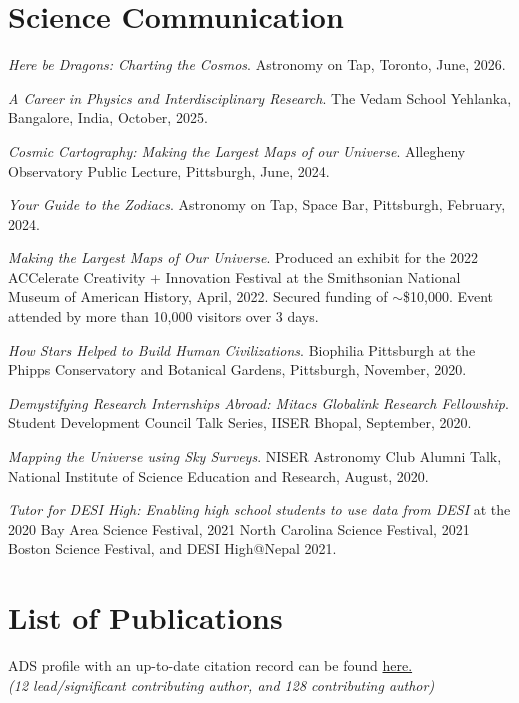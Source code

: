 \documentclass[10pt,a4paper,roman,]{moderncv} %
\begin{document}
\section{Science Communication}

 \begin{etaremune}[leftmargin=40pt,labelsep=10pt]
 \item \textit{Here be Dragons: Charting the Cosmos}. Astronomy on Tap, Toronto, June, 2026.
 \item \textit{A Career in Physics and Interdisciplinary Research}. The Vedam School Yehlanka, Bangalore, India, October, 2025.
 \item \textit{Cosmic Cartography: Making the Largest Maps of our Universe}. Allegheny Observatory Public Lecture, Pittsburgh, June, 2024.
 \item \textit{Your Guide to the Zodiacs}. Astronomy on Tap, Space Bar, Pittsburgh, February, 2024.
 \item \textit{Making the Largest Maps of Our Universe}. Produced an exhibit for the 2022 ACCelerate Creativity + Innovation Festival at the Smithsonian National Museum of American History, April, 2022. Secured funding of $\sim$\$10,000. Event attended by more than 10,000 visitors over 3 days. 
 \item \textit{How Stars Helped to Build Human Civilizations}. Biophilia Pittsburgh at the Phipps Conservatory and Botanical Gardens, Pittsburgh, November, 2020.
\item \textit{Demystifying Research Internships Abroad: Mitacs Globalink Research Fellowship}. Student Development
Council Talk Series, IISER Bhopal, September, 2020.
\item \textit{Mapping the Universe using Sky Surveys}. NISER Astronomy Club Alumni Talk, National Institute of Science Education and Research, August, 2020.
\item \textit{Tutor for DESI High: Enabling high school students to use data from DESI} at the 2020 Bay Area Science Festival, 2021 North Carolina Science Festival, 2021 Boston Science Festival, and DESI High@Nepal 2021.
\end{etaremune}


\section{List of Publications}
\begin{center}
ADS profile with an up-to-date citation record can be found \href{https://ui.adsabs.harvard.edu/search/p_=0&q=orcid\%3A0000-0002-5665-7912&sort=date\%20desc\%2C\%20bibcode\%20desc}{here.} \\
    \textit{(12 lead/significant contributing author, and 128 contributing author)\\}
    
    

\end{center}
\end{document}
